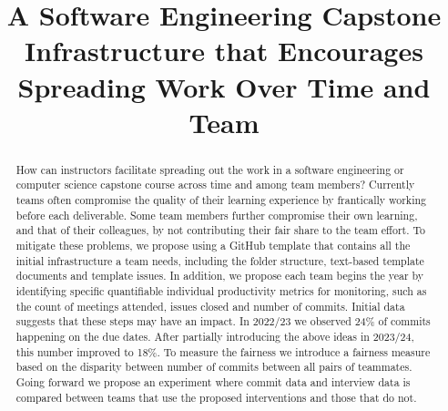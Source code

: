 \documentclass[10pt, conference]{IEEEtran}
\begin{document}
\title{A Software Engineering Capstone Infrastructure that Encourages Spreading
Work Over Time and Team}

\author{\IEEEauthorblockN{}
\IEEEauthorblockA{}


}

\maketitle
  
\begin{abstract}

How can instructors facilitate spreading out the work in a software engineering
or computer science capstone course across time and among team members?
Currently teams often compromise the quality of their learning experience by
frantically working before each deliverable.  Some team members further
compromise their own learning, and that of their colleagues, by not contributing
their fair share to the team effort. To mitigate these problems, we propose
using a GitHub template that contains all the initial infrastructure a team
needs, including the folder structure, text-based template documents and
template issues. In addition, we propose each team begins the year by
identifying specific quantifiable individual productivity metrics for
monitoring, such as the count of meetings attended, issues closed and number of
commits.  Initial data suggests that these steps may have an impact.  In 2022/23
we observed 24\% of commits happening on the due dates.  After partially
introducing the above ideas in 2023/24, this number improved to 18\%.  To
measure the fairness we introduce a fairness measure based on the disparity
between number of commits between all pairs of teammates.  Going forward we
propose an experiment where commit data and interview data is compared between
teams that use the proposed interventions and those that do not.

\end{abstract}
\end{document}
